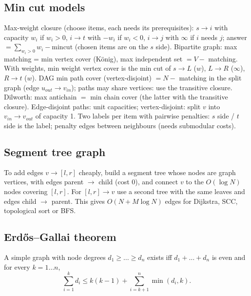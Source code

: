 	\subsection{Min cut models}
		Max-weight closure (choose items, each needs its prerequisites): $s \to i$ with capacity $w_i$ if $w_i > 0$, $i \to t$ with $-w_i$ if $w_i < 0$,
		$i \to j$ with $\infty$ if $i$ needs $j$; answer $= \sum_{w_i > 0} w_i - \mathrm{mincut}$ (chosen items are on the $s$ side).
		Bipartite graph: max matching = min vertex cover (K\"onig), max independent set $= V -$ matching.
		With weights, min weight vertex cover is the min cut of $s \to L$ ($w$), $L \to R$ ($\infty$), $R \to t$ ($w$).
		DAG min path cover (vertex-disjoint) $= N -$ matching in the split graph (edge $u_{out} \to v_{in}$); paths may share vertices: use the transitive closure.
		Dilworth: max antichain $=$ min chain cover (the latter with the transitive closure).
		Edge-disjoint paths: unit capacities; vertex-disjoint: split $v$ into $v_{in} \to v_{out}$ of capacity 1.
		Two labels per item with pairwise penalties: $s$ side / $t$ side is the label; penalty edges between neighbours (needs submodular costs).

	\subsection{Segment tree graph}
		To add edges $v \to [l, r]$ cheaply, build a segment tree whose nodes are graph vertices, with edges parent $\to$ child (cost 0), and connect $v$ to the $O(\log N)$ nodes covering $[l, r]$.
		For $[l, r] \to v$ use a second tree with the same leaves and edges child $\to$ parent.
		This gives $O(N + M \log N)$ edges for Dijkstra, SCC, topological sort or BFS.

	\subsection{Erdős–Gallai theorem}
		A simple graph with node degrees $d_1 \ge \dots \ge d_n$ exists iff $d_1 + \dots + d_n$ is even and for every $k = 1\dots n$,
		\[ \sum _{i=1}^{k}d_{i}\leq k(k-1)+\sum _{i=k+1}^{n}\min(d_{i},k). \]
